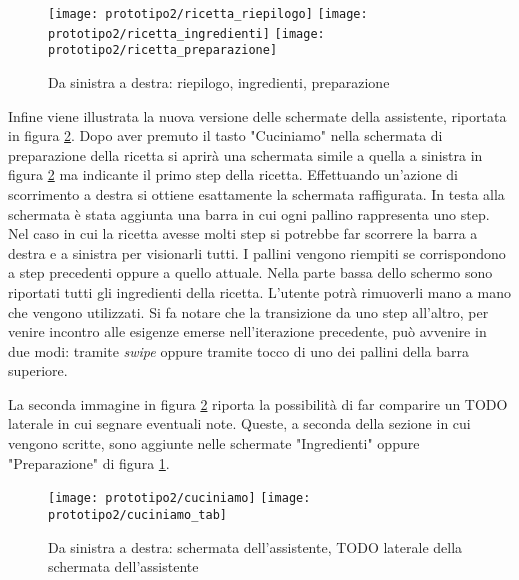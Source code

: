 \begin{figure}[ht]
  \begin{center}
    \texttt{[image: prototipo2/ricetta\_riepilogo]}
    \texttt{[image: prototipo2/ricetta\_ingredienti]}
    \texttt{[image: prototipo2/ricetta\_preparazione]}
    \caption{Da sinistra a destra: riepilogo, ingredienti, preparazione}
    \label{fig:p2_ricetta}
  \end{center}
\end{figure}

Infine viene illustrata la nuova versione delle schermate della assistente, riportata in figura \ref{fig:p2_cuciniamo}.
Dopo aver premuto il tasto "Cuciniamo" nella schermata di preparazione della ricetta si aprirà una schermata simile a quella a sinistra in figura \ref{fig:p2_cuciniamo} ma indicante il primo step della ricetta.
Effettuando un'azione di scorrimento a destra si ottiene esattamente la schermata raffigurata.
In testa alla schermata è stata aggiunta una barra in cui ogni pallino rappresenta uno step.
Nel caso in cui la ricetta avesse molti step si potrebbe far scorrere la barra a destra e a sinistra per visionarli tutti.
I pallini vengono riempiti se corrispondono a step precedenti oppure a quello attuale.
Nella parte bassa dello schermo sono riportati tutti gli ingredienti della ricetta.
L'utente potrà rimuoverli mano a mano che vengono utilizzati.
Si fa notare che la transizione da uno step all'altro, per venire incontro alle esigenze emerse nell'iterazione precedente, può avvenire in due modi: tramite \textit{swipe} oppure tramite tocco di uno dei pallini della barra superiore.

La seconda immagine in figura \ref{fig:p2_cuciniamo} riporta la possibilità di far comparire un TODO laterale in cui segnare eventuali note.
Queste, a seconda della sezione in cui vengono scritte, sono aggiunte nelle schermate "Ingredienti" oppure "Preparazione" di figura \ref{fig:p2_ricetta}.

\begin{figure}[ht]
  \begin{center}
    \texttt{[image: prototipo2/cuciniamo]}
    \texttt{[image: prototipo2/cuciniamo\_tab]}
    \caption{Da sinistra a destra: schermata dell'assistente, TODO laterale della schermata dell'assistente}
    \label{fig:p2_cuciniamo}
  \end{center}
\end{figure}

